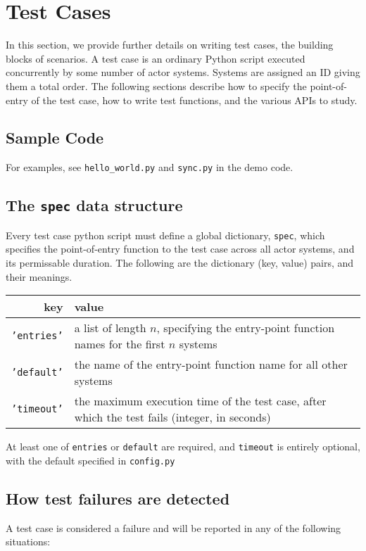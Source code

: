 \section{Test Cases}
In this section, we provide further details on writing test cases, the building
blocks of scenarios. A test case is an ordinary Python script executed
concurrently by some number of actor systems. Systems are assigned an ID giving
them a total order. The following sections describe how to specify the
point-of-entry of the test case, how to write test functions, and the various
APIs to study.

\subsection{Sample Code}
For examples, see {\tt hello\_world.py} and {\tt sync.py} in the demo code.

\subsection{The {\tt spec} data structure}
Every test case python script must define a global dictionary, {\tt spec}, which
specifies the point-of-entry function to the test case across all actor systems,
and its permissable duration.  The following are the dictionary (key, value)
pairs, and their meanings.

\begin{center}
\begin{tabular}{ r | p{8cm} }
    key           & value \\
    \hline
    {\tt 'entries'} 
        & a list of length $n$, specifying the entry-point function names for
          the first $n$ systems \\
    {\tt 'default'}
        & the name of the entry-point function name for all other systems \\
    {\tt 'timeout'}
        & the maximum execution time of the test case, after which the test
          fails (integer, in seconds) \\
\end{tabular}
\end{center}

At least one of {\tt entries} or {\tt default} are required, and {\tt timeout}
is entirely optional, with the default specified in {\tt config.py}

\subsection{How test failures are detected}
A test case is considered a failure and will be reported in any of the 
following situations:

